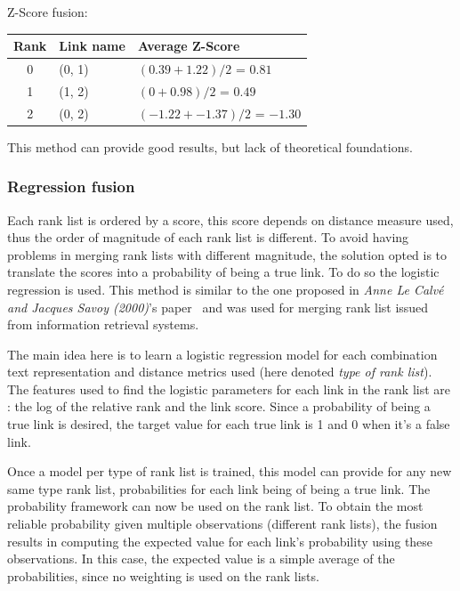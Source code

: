 Z-Score fusion:

\begin{tabular}{c l l}
  \toprule
  Rank & Link name & Average Z-Score \\
  \midrule
  0 & (0, 1) & $(0.39 + 1.22) / 2$ = $0.81$ \\
  1 & (1, 2) & $(0 + 0.98) / 2$ = $0.49$ \\
  2 & (0, 2) & $(-1.22 + -1.37) / 2$ = $-1.30$ \\
  \bottomrule
\end{tabular}

This method can provide good results, but lack of theoretical foundations.

\subsubsection{Regression fusion \label{sec:regression_fusion}}

Each rank list is ordered by a score, this score depends on distance measure used, thus the order of magnitude of each rank list is different.
To avoid having problems in merging rank lists with different magnitude, the solution opted is to translate the scores into a probability of being a true link.
To do so the logistic regression is used.
This method is similar to the one proposed in \textit{Anne Le Calvé and Jacques Savoy (2000)}'s paper~\cite{le_calve_database_merging} and was used for merging rank list issued from information retrieval systems.

The main idea here is to learn a logistic regression model for each combination text representation and distance metrics used (here denoted \textit{type of rank list}).
The features used to find the logistic parameters for each link in the rank list are : the log of the relative rank and the link score.
Since a probability of being a true link is desired, the target value for each true link is 1 and 0 when it's a false link.

Once a model per type of rank list is trained, this model can provide for any new same type rank list, probabilities for each link being of being a true link.
The probability framework can now be used on the rank list.
To obtain the most reliable probability given multiple observations (different rank lists), the fusion results in computing the expected value for each link's probability using these observations.
In this case, the expected value is a simple average of the probabilities, since no weighting is used on the rank lists.

